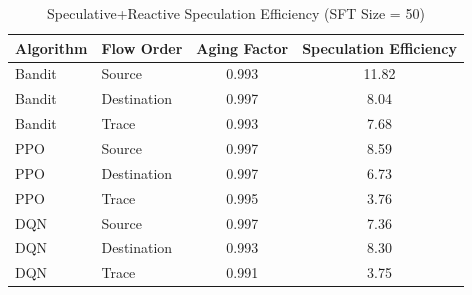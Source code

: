 \begin{table}[ht]
\centering
\caption{Speculative+Reactive Speculation Efficiency (SFT Size = 50)}
\label{tab:speculativereactive-speculation-efficiency-50}
\begin{tabular}{llcc}
\toprule
Algorithm & Flow Order & Aging Factor & Speculation Efficiency \\
\midrule
Bandit & Source & 0.993 & 11.82 \\
Bandit & Destination & 0.997 & 8.04 \\
Bandit & Trace & 0.993 & 7.68 \\
PPO & Source & 0.997 & 8.59 \\
PPO & Destination & 0.997 & 6.73 \\
PPO & Trace & 0.995 & 3.76 \\
DQN & Source & 0.997 & 7.36 \\
DQN & Destination & 0.993 & 8.30 \\
DQN & Trace & 0.991 & 3.75 \\
\bottomrule
\end{tabular}
\end{table}
